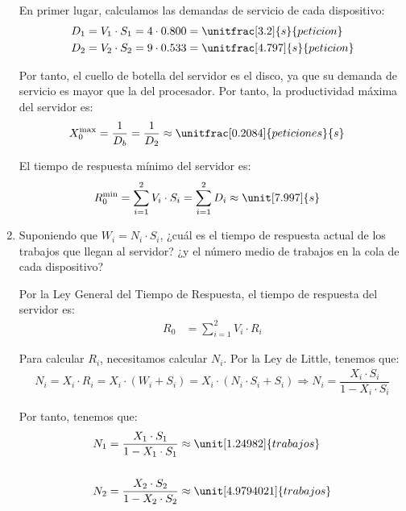 \begin{ejercicio}
\begin{enumerate}
        En primer lugar, calculamos las demandas de servicio de cada dispositivo:
        \begin{align*}
            D_1 &= V_1 \cdot S_1 = 4 \cdot 0.800 = \unitfrac[3.2]{s}{peticion} \\
            D_2 &= V_2 \cdot S_2 = 9 \cdot 0.533 = \unitfrac[4.797]{s}{peticion}
        \end{align*}

        Por tanto, el cuello de botella del servidor es el disco, ya que su demanda de servicio es mayor que la del procesador. Por tanto, la productividad máxima del servidor es:
        \begin{align*}
            X_0^{\max} &= \dfrac{1}{D_b} = \dfrac{1}{D_2} \approx \unitfrac[0.2084]{peticiones}{s}
        \end{align*}

        El tiempo de respuesta mínimo del servidor es:
        \begin{align*}
            R_0^{\min} &= \sum_{i=1}^{2} V_i \cdot S_i = \sum_{i=1}^{2} D_i \approx \unit[7.997]{s}
        \end{align*}
        \item Suponiendo que $W_i = N_i \cdot S_i$, ¿cuál es el tiempo de respuesta actual de los trabajos que llegan al servidor? ¿y el número medio de trabajos en la cola de cada dispositivo?
        
        Por la Ley General del Tiempo de Respuesta, el tiempo de respuesta del servidor es:
        \begin{align*}
            R_0 &= \sum_{i=1}^{2} V_i \cdot R_i
        \end{align*}

        Para calcular $R_i$, necesitamos calcular $N_i$. Por la Ley de Little, tenemos que:
        \begin{align*}
            N_i = X_i \cdot R_i
            = X_i \cdot (W_i+ S_i)
            = X_i \cdot (N_i \cdot S_i + S_i)
            \Longrightarrow N_i = \dfrac{X_i \cdot S_i}{1 - X_i \cdot S_i}
        \end{align*}

        Por tanto, tenemos que:
        \begin{align*}
            N_1 &= \dfrac{X_1 \cdot S_1}{1 - X_1 \cdot S_1} \approx \unit[1.24982]{trabajos} \\
            \\
            N_2 &= \dfrac{X_2 \cdot S_2}{1 - X_2 \cdot S_2} \approx \unit[4.9794021]{trabajos}
        \end{align*}


\end{enumerate}
\end{ejercicio}
